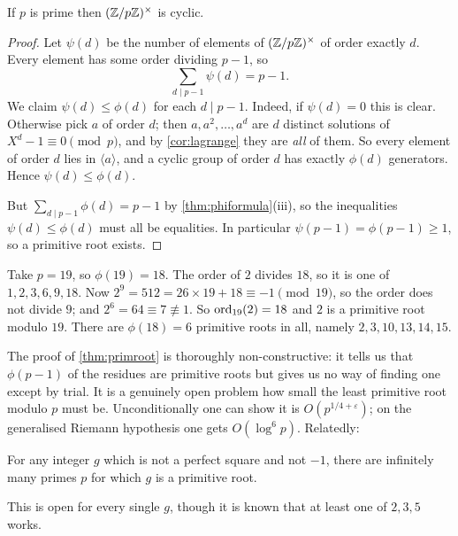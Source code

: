 \documentclass[a4paper]{scrartcl}
\begin{document}
\begin{theorem}\label{thm:primroot}
	If $p$ is prime then $(\mathbb{Z}/p\mathbb{Z})^\times$ is cyclic.
\end{theorem}
\begin{proof}
	Let $\psi(d)$ be the number of elements of $(\mathbb{Z}/p\mathbb{Z})^\times$ of order exactly $d$. Every element has some order dividing $p - 1$, so
	$$
	\sum_{d \mid p - 1} \psi(d) = p - 1.
	$$
	We claim $\psi(d) \leq \phi(d)$ for each $d \mid p-1$. Indeed, if $\psi(d) = 0$ this is clear. Otherwise pick $a$ of order $d$; then $a, a^2, \dots, a^d$ are $d$ distinct solutions of $X^d - 1 \equiv 0 \pmod p$, and by \autoref{cor:lagrange} they are \emph{all} of them. So every element of order $d$ lies in $\langle a \rangle$, and a cyclic group of order $d$ has exactly $\phi(d)$ generators. Hence $\psi(d) \leq \phi(d)$.

	But $\sum_{d \mid p-1}\phi(d) = p - 1$ by \autoref{thm:phiformula}(iii), so the inequalities $\psi(d) \leq \phi(d)$ must all be equalities. In particular $\psi(p-1) = \phi(p-1) \geq 1$, so a primitive root exists.
\end{proof}

\begin{example}
	Take $p = 19$, so $\phi(19) = 18$. The order of $2$ divides $18$, so it is one of $1, 2, 3, 6, 9, 18$. Now $2^9 = 512 = 26 \times 19 + 18 \equiv -1 \pmod{19}$, so the order does not divide $9$; and $2^6 = 64 \equiv 7 \not\equiv 1$. So $\operatorname{ord}_{19}(2) = 18$ and $2$ is a primitive root modulo $19$. There are $\phi(18) = 6$ primitive roots in all, namely $2, 3, 10, 13, 14, 15$.
\end{example}

\begin{remark}
	The proof of \autoref{thm:primroot} is thoroughly non-constructive: it tells us that $\phi(p-1)$ of the residues are primitive roots but gives us no way of finding one except by trial. It is a genuinely open problem how small the least primitive root modulo $p$ must be. Unconditionally one can show it is $O(p^{1/4 + \varepsilon})$; on the generalised Riemann hypothesis one gets $O(\log^6 p)$. Relatedly:
\end{remark}

\begin{conjecture}[Artin]
	For any integer $g$ which is not a perfect square and not $-1$, there are infinitely many primes $p$ for which $g$ is a primitive root.
\end{conjecture}

This is open for every single $g$, though it is known that at least one of $2, 3, 5$ works.
\end{document}
